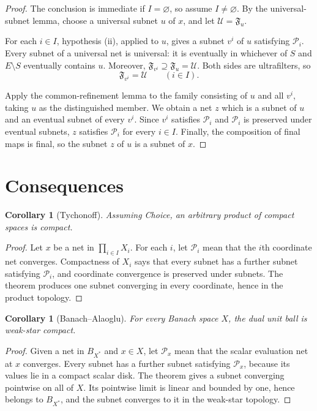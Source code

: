 \documentclass[11pt]{article}
\newtheorem{corollary}[theorem]{Corollary}
\theoremstyle{definition}
\newcommand{\cU}{\mathcal U}
\newcommand{\cP}{\mathcal P}
\begin{document}
\begin{proof}
The conclusion is immediate if $I=\varnothing$, so assume $I\neq\varnothing$.
By the universal-subnet lemma, choose a universal subnet $u$ of $x$, and let
$\cU=\mathfrak F_u$.

For each $i\in I$, hypothesis (ii), applied to $u$, gives a subnet $v^i$ of
$u$ satisfying $\cP_i$.  Every subnet of a universal net is universal: it is
eventually in whichever of $S$ and $E\setminus S$ eventually contains $u$.
Moreover, $\mathfrak F_{v^i}\supseteq\mathfrak F_u=\cU$.  Both sides are
ultrafilters, so
\[
 \mathfrak F_{v^i}=\cU\qquad(i\in I).
\]

Apply the common-refinement lemma to the family consisting of $u$ and all
$v^i$, taking $u$ as the distinguished member.  We obtain a net $z$ which is
a subnet of $u$ and an eventual subnet of every $v^i$.  Since $v^i$ satisfies
$\cP_i$ and $\cP_i$ is preserved under eventual subnets, $z$ satisfies
$\cP_i$ for every $i\in I$.  Finally, the composition of final maps is final,
so the subnet $z$ of $u$ is a subnet of $x$.
\end{proof}

\section{Consequences}

\begin{corollary}[Tychonoff]
Assuming Choice, an arbitrary product of compact spaces is compact.
\end{corollary}

\begin{proof}
Let $x$ be a net in $\prod_{i\in I}X_i$.  For each $i$, let $\cP_i$ mean
that the $i$th coordinate net converges.  Compactness of $X_i$ says that every
subnet has a further subnet satisfying $\cP_i$, and coordinate convergence is
preserved under subnets.  The theorem produces one subnet converging in every
coordinate, hence in the product topology.
\end{proof}

\begin{corollary}[Banach--Alaoglu]
For every Banach space $X$, the dual unit ball is weak-star compact.
\end{corollary}

\begin{proof}
Given a net in $B_{X^*}$ and $x\in X$, let $\cP_x$ mean that the scalar
evaluation net at $x$ converges.  Every subnet has a further subnet satisfying
$\cP_x$, because its values lie in a compact scalar disk.  The theorem gives
a subnet converging pointwise on all of $X$.  Its pointwise limit is linear
and bounded by one, hence belongs to $B_{X^*}$, and the subnet converges to it
in the weak-star topology.
\end{proof}
\end{document}
